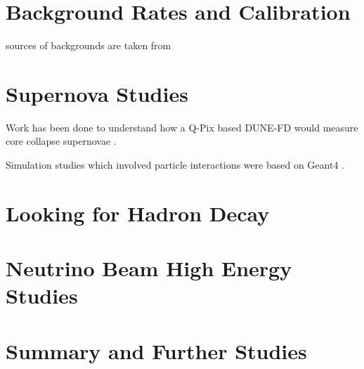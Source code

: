 \section{Background Rates and Calibration}

sources of backgrounds are taken from \citep{DUNE-FD_TDRv4:Abi_2020}

\section{Supernova Studies}

Work has been done to understand how a Q-Pix based DUNE-FD would measure core collapse supernovae \citep{qpix:shion}.

Simulation studies which involved particle interactions were based on Geant4 \citep{geant4:AGOSTINELLI2003250}.


\section{Looking for Hadron Decay}

\section{Neutrino Beam High Energy Studies}

\section{Summary and Further Studies}
